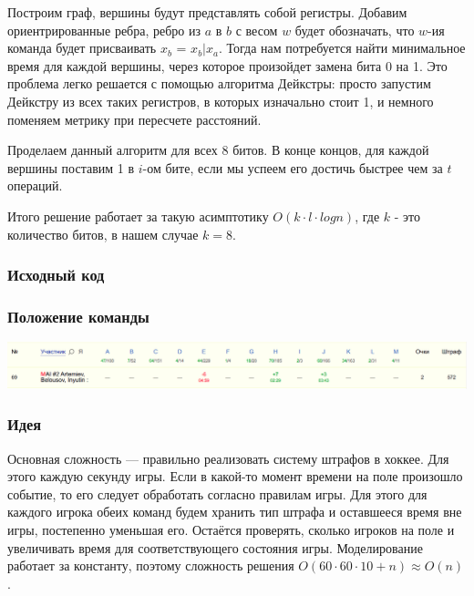 \documentclass[12pt]{article}
\begin{document}
Построим граф, вершины будут представлять собой регистры. Добавим ориентрированные ребра, ребро из $a$ в $b$ с весом $w$ будет обозначать, что $w$-ия команда будет присваивать $x_b$ = $x_b | x_a$. Тогда нам потребуется найти минимальное время для каждой вершины, через которое произойдет замена бита 0 на 1. Это проблема легко решается с помощью алгоритма Дейкстры: просто запустим Дейкстру из всех таких регистров, в которых изначально стоит 1, и немного поменяем метрику при пересчете расстояний. 

Проделаем данный алгоритм для всех 8 битов. В конце концов, для каждой вершины поставим 1 в $i$-ом бите, если мы успеем его достичь быстрее чем за $t$ операций.

Итого решение работает за такую асимптотику $O(k\cdot l\cdot logn)$, где $k$ - это количество битов, в нашем случае $k = 8$.

\subsubsection*{Исходный код}

\subsubsection*{Положение команды}
\includegraphics[scale=0.25]{images/gp_korea.png}\newline\noindent
\pagebreak


\subsubsection*{Идея}
Основная сложность --- правильно реализовать систему штрафов в хоккее. Для этого каждую секунду игры. Если в какой-то момент времени на поле произошло событие, то его следует обработать согласно правилам игры. Для этого для каждого игрока обеих команд будем хранить тип штрафа и оставшееся время вне игры, постепенно уменьшая его. Остаётся проверять, сколько игроков на поле и увеличивать время для соответствующего состояния игры. Моделирование работает за константу, поэтому сложность решения $O(60 \cdot 60 \cdot 10 + n) \approx O(n)$.
\end{document}
